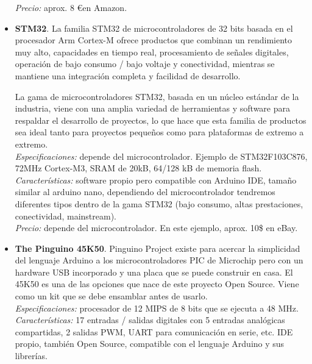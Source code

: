 \documentclass[12pt]{article}
\begin{document}
\begin{itemize}
		\textit{Precio:} aprox. 8 \euro \enspace en Amazon.\\
	
		\item \textbf{STM32}. La familia STM32 de microcontroladores de 32 bits basada en el procesador Arm Cortex-M ofrece productos que combinan un rendimiento muy alto, capacidades en tiempo real, procesamiento de señales digitales, operación de bajo consumo / bajo voltaje y conectividad, mientras se mantiene una integración completa y facilidad de desarrollo.
		
		La gama de microcontroladores STM32, basada en un núcleo estándar de la industria, viene con una amplia variedad de herramientas y software para respaldar el desarrollo de proyectos, lo que hace que esta familia de productos sea ideal tanto para proyectos pequeños como para plataformas de extremo a extremo. \\
		
		\textit{Especificaciones:} depende del microcontrolador. Ejemplo de STM32F103C876, 72MHz Cortex-M3, SRAM de 20kB, 64/128 kB de memoria flash. \\
		
		\textit{Características:} software propio pero compatible con Arduino IDE, tamaño similar al arduino nano, dependiendo del microcontrolador tendremos diferentes tipos dentro de la gama STM32 (bajo consumo, altas prestaciones, conectividad, mainstream). \\
		
		\textit{Precio:} depende del microcontrolador. En este ejemplo, aprox. 10\$ en eBay. \\
		
		\item \textbf{The Pinguino 45K50}. Pinguino Project existe para acercar la simplicidad del lenguaje Arduino a los microcontroladores PIC de Microchip pero con un hardware USB incorporado y una placa que se puede construir en casa. El 45K50 es una de las opciones que nace de este proyecto Open Source.  Viene como un kit que se debe ensamblar antes de usarlo. \\
		
		\textit{Especificaciones:} procesador de 12 MIPS de 8 bits que se ejecuta a 48 MHz.\\
		
		\textit{Características:} 17 entradas / salidas digitales con 5 entradas analógicas compartidas, 2 salidas PWM, UART para comunicación en serie, etc.  IDE propio, también Open Source, compatible con el lenguaje Arduino y sus librerías.\\
		

\end{itemize}
\end{document}
